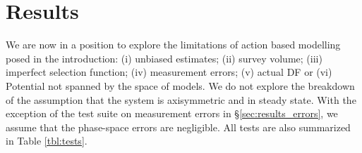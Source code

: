 \section{Results} \label{sec:results}

We are now in a position to explore the limitations of action based modelling posed in the introduction: (i) unbiased estimates; (ii) survey volume; (iii) imperfect selection function; (iv) measurement errors; (v) actual DF or (vi) Potential not spanned by the space of models. We do not explore the breakdown of the assumption that the system is axisymmetric and
in steady state. With the exception of the test suite on measurement errors in \S\ref{sec:results_errors}, we assume that the phase-space errors are negligible. All tests are also summarized in Table \ref{tbl:tests}. 




